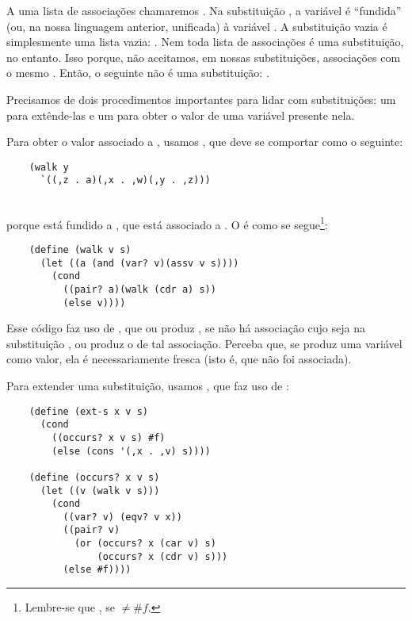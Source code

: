   A uma lista de associações chamaremos . Na
  substituição , a variável  é
  ``fundida'' (ou, na nossa linguagem anterior, unificada) à variável
  . A substituição vazia é simplesmente uma lista vazia:
  . Nem toda lista de associações é uma
  substituição, no entanto. Isso porque, não aceitamos, em nossas
  substituições, associações com o mesmo . Então, o
  seguinte não é uma substituição: .

  Precisamos de dois procedimentos importantes para lidar com
  substituições: um para extênde-las e um para obter o valor de uma
  variável presente nela.

  Para obter o valor associado a , usamos ,
  que deve se comportar como o seguinte:
  \begin{lstlisting}
    (walk y
      `((,z . a)(,x . ,w)(,y . ,z)))
  \end{lstlisting}
  \hspace{1cm} \seta {}\\
  porque  está fundido a , que está associado
  a . O  é como se
  segue\footnote{Lembre-se que  \seta {},
    se  $\neq \#f$.}:

  \begin{lstlisting}
    (define (walk v s)
      (let ((a (and (var? v)(assv v s))))
        (cond
          ((pair? a)(walk (cdr a) s))
          (else v))))
  \end{lstlisting}

  \noindent Esse código faz uso de , que ou produz
  , se não há associação cujo  seja
   na substituição , ou produz o
   de tal associação. Perceba que, se 
  produz uma variável como valor, ela é necessariamente fresca (isto
  é, que não foi associada).

  Para extender uma substituição, usamos , que faz
  uso de :

  \begin{lstlisting}
    (define (ext-s x v s)
      (cond
        ((occurs? x v s) #f)
        (else (cons '(,x . ,v) s))))

    (define (occurs? x v s)
      (let ((v (walk v s)))
        (cond
          ((var? v) (eqv? v x))
          ((pair? v)
            (or (occurs? x (car v) s)
                (occurs? x (cdr v) s)))
          (else #f))))
  \end{lstlisting}

